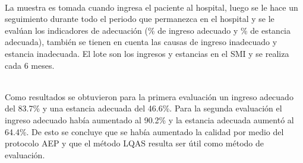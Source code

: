 ~\\La muestra es tomada cuando ingresa el paciente al hospital, luego se le hace un seguimiento durante todo el periodo que permanezca en el hospital y se le eval\'{u}an los indicadores de adecuaci\'{o}n (\% de ingreso adecuado y \% de estancia adecuada), tambi\'{e}n se tienen en cuenta las causas de ingreso inadecuado y estancia inadecuada. El lote son los ingresos y estancias en el SMI y se realiza cada 6 meses.

~\\Como resultados se obtuvieron para la primera evaluaci\'{o}n un ingreso adecuado del 83.7\% y una estancia adecuada del 46.6\%. Para la segunda evaluaci\'{o}n  el ingreso adecuado hab\'{i}a aumentado al 90.2\% y la estancia adecuada aument\'{o} al 64.4\%. De esto se concluye que se hab\'{i}a aumentado la calidad por medio del protocolo AEP y que el m\'{e}todo LQAS resulta ser \'{u}til como m\'{e}todo de evaluaci\'{o}n.


~\\\textbf{\citet{AE5}}
~\\